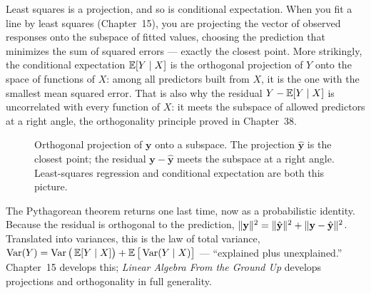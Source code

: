 \begin{happeningbox}
Least squares is a projection, and so is conditional expectation. When you fit a line by least
squares (Chapter~15), you are projecting the vector of observed responses onto the subspace
of fitted values, choosing the prediction that minimizes the sum of squared errors --- exactly the
closest point. More strikingly, the conditional expectation $\operatorname{\mathbb{E}}[Y\mid X]$ is the orthogonal
projection of $Y$ onto the space of functions of $X$: among all predictors built from $X$, it is the
one with the smallest mean squared error. That is also why the residual $Y-\operatorname{\mathbb{E}}[Y\mid X]$ is
uncorrelated with every function of $X$: it meets the subspace of allowed predictors at a right
angle, the orthogonality principle proved in Chapter~38.
\end{happeningbox}

\begin{figure}[H]
\centering
{}
\caption{Orthogonal projection of $\mathbf{y}$ onto a subspace. The projection $\hat{\mathbf{y}}$ is
the closest point; the residual $\mathbf{y}-\hat{\mathbf{y}}$ meets the subspace at a right angle.
Least-squares regression and conditional expectation are both this picture.}
\label{chAcla:fig-projection}
\end{figure}

\begin{connectionbox}
The Pythagorean theorem returns one last time, now as a probabilistic identity. Because the residual
is orthogonal to the prediction, $\lVert\mathbf{y}\rVert^2 = \lVert\hat{\mathbf{y}}\rVert^2 +
\lVert\mathbf{y}-\hat{\mathbf{y}}\rVert^2$. Translated into variances, this is the law of total variance,
$\operatorname{Var}(Y) = \operatorname{Var}\big(\operatorname{\mathbb{E}}[Y\mid X]\big) + \operatorname{\mathbb{E}}\big[\operatorname{Var}(Y\mid X)\big]$ --- ``explained plus
unexplained.'' Chapter~15 develops this; \emph{Linear Algebra From the
Ground Up} develops projections and orthogonality in full generality.
\end{connectionbox}

